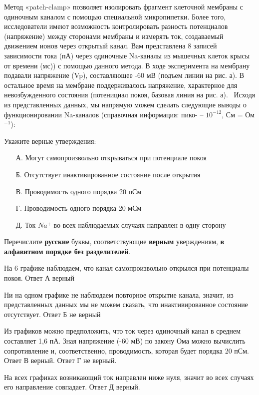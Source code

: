 
Метод «patch-clamp» позволяет изолировать фрагмент клеточной мембраны с одиночным каналом с помощью специальной микропипетки. Более того, исследователи имеют возможность контролировать разность потенциалов (напряжение) между сторонами мембраны и измерять ток, создаваемый движением ионов через открытый канал. Вам представлена 8 записей зависимости тока (пА) через одиночные Na-каналы из мышечных клеток крысы от времени (мс)) с помощью данного метода. В ходе эксперимента на мембрану подавали напряжение (Vp), составляющее -60 мВ (подъем линии на рис. а). В остальное время на мембране поддерживалось напряжение, характерное для невозбужденного состояния (потенициал покоя, базовая линия на рис. а).  Исходя из представленных данных, мы напрямую можем сделать следующие выводы о функционировании Na-каналов (справочная информация: пико- – $10^{-12}$, См = Ом$^{-1}$):


Укажите верные утверждения:
\begin{enumerate}
    \item[А.] Могут самопроизвольно открываться при потенциале покоя
    \item[Б.] Отсутствует инактивированное состояние после открытия
    \item[В.] Проводимость одного порядка 20 пСм
    \item[Г.] Проводимость одного порядка 20 мСм
    \item[Д.] Ток $Na^+$ во всех наблюдаемых случаях направлен в одну сторону
\end{enumerate}

Перечислите \textbf{русские} буквы, соответствующие \textbf{верным} уверждениям, \textbf{в алфавитном порядке без разделителей}.

\explanationSection

На 6 графике наблюдаем, что канал самопроизвольно открылся при потенциалы покоя. Ответ А верный

Ни на одном графике не наблюдаем повторное открытие канала, значит, из представленных данных мы не можем сказать, что инактивированное состояние отсутствует. Ответ Б не верный

Из графиков можно предположить, что ток через одиночный канал в среднем составляет 1,6 пА. Зная напряжение (-60 мВ) по закону Ома можно вычислить сопротивление и, соответственно, проводимость, которая будет порядка 20 пСм. Ответ В верный. Ответ Г не верный.

На всех графиках возникающий ток направлен ниже нуля, значит во всех случаях его направление совпадает. Ответ Д верный.

